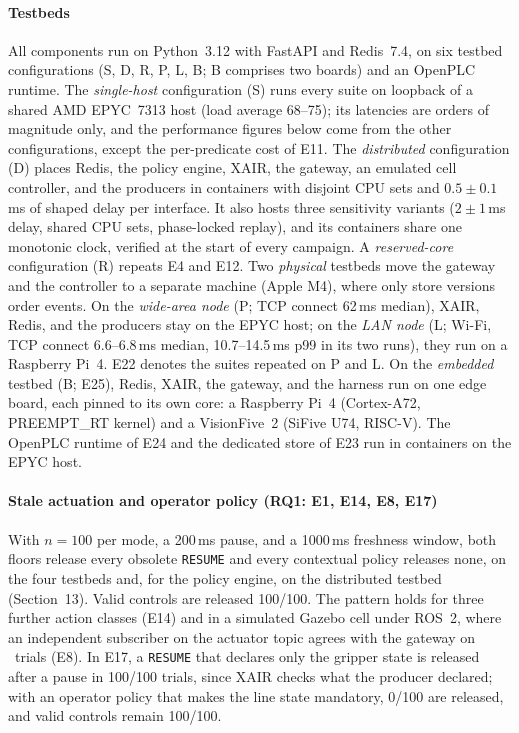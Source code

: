 \documentclass[11pt]{article}
\begin{document}
\paragraph{Testbeds}
All components run on Python~3.12 with FastAPI and Redis~7.4, on six testbed configurations (S, D, R, P, L, B; B comprises two boards) and an OpenPLC runtime. The \emph{single-host} configuration (S) runs every suite on loopback of a shared AMD EPYC~7313 host (load average 68--75); its latencies are orders of magnitude only, and the performance figures below come from the other configurations, except the per-predicate cost of E11. The \emph{distributed} configuration (D) places Redis, the policy engine, XAIR, the gateway, an emulated cell controller, and the producers in containers with disjoint CPU sets and $0.5\pm0.1$\,ms of shaped delay per interface. It also hosts three sensitivity variants ($2\pm1$\,ms delay, shared CPU sets, phase-locked replay), and its containers share one monotonic clock, verified at the start of every campaign. A \emph{reserved-core} configuration (R) repeats E4 and E12. Two \emph{physical} testbeds move the gateway and the controller to a separate machine (Apple M4), where only store versions order events. On the \emph{wide-area node} (P; TCP connect 62\,ms median), XAIR, Redis, and the producers stay on the EPYC host; on the \emph{LAN node} (L; Wi-Fi, TCP connect 6.6--6.8\,ms median, 10.7--14.5\,ms p99 in its two runs), they run on a Raspberry Pi~4. E22 denotes the suites repeated on P and L. On the \emph{embedded} testbed (B; E25), Redis, XAIR, the gateway, and the harness run on one edge board, each pinned to its own core: a Raspberry Pi~4 (Cortex-A72, PREEMPT\_RT kernel) and a VisionFive~2 (SiFive U74, RISC-V). The OpenPLC runtime of E24 and the dedicated store of E23 run in containers on the EPYC host.

\paragraph{Stale actuation and operator policy (RQ1: E1, E14, E8, E17)}
With $n{=}100$ per mode, a 200\,ms pause, and a 1000\,ms freshness window, both floors release every obsolete \texttt{RESUME} and every contextual policy releases none, on the four testbeds and, for the policy engine, on the distributed testbed (Section~13). Valid controls are released 100/100. The pattern holds for three further action classes (E14) and in a simulated Gazebo cell under ROS~2, where an independent subscriber on the actuator topic agrees with the gateway on \EightWitness\ trials (E8). In E17, a \texttt{RESUME} that declares only the gripper state is released after a pause in 100/100 trials, since XAIR checks what the producer declared; with an operator policy that makes the line state mandatory, 0/100 are released, and valid controls remain 100/100.
\end{document}
